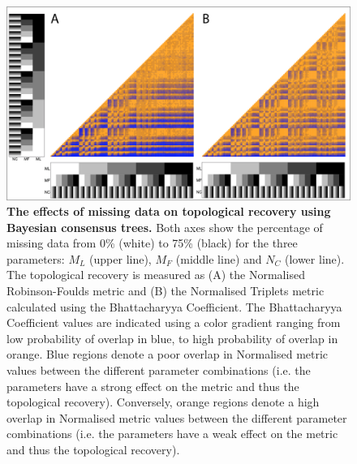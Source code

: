 \begin{figure}[!ht]
\centering
    \includegraphics[width=1\textwidth]{TEM/Figures/Fig6_revised.png}
\caption[Effects of missing data on topological recovery using Bayesian consensus trees]{\textbf{The effects of missing data on topological recovery using Bayesian consensus trees.} Both axes show the percentage of missing data from 0\% (white) to 75\% (black) for the three parameters: $M_{L}$ (upper line), $M_{F}$ (middle line) and $N_{C}$ (lower line). The topological recovery is measured as (A) the Normalised Robinson-Foulds metric and (B) the Normalised Triplets metric calculated using the Bhattacharyya Coefficient. The Bhattacharyya Coefficient values are indicated using a color gradient ranging from low probability of overlap in blue, to high probability of overlap in orange. Blue regions denote a poor overlap in Normalised metric values between the different parameter combinations (i.e. the parameters have a strong effect on the metric and thus the topological recovery). Conversely, orange regions denote a high overlap in Normalised metric values between the different parameter combinations (i.e. the parameters have a weak effect on the metric and thus the topological recovery).}
\label{Fig_Results-paircomp_within}
\end{figure}

